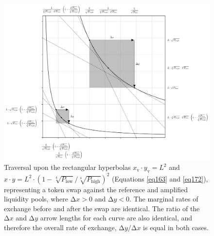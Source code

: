 \documentclass{article}
\begin{document}
\begin{figure}[ht]
    \centering
    \includegraphics[width=\textwidth]{fig34.png}
    \captionsetup{
        justification=raggedright,
        singlelinecheck=false,
        font=small,
        labelfont=bf,
        labelsep=quad,
        format=plain
    }
    \caption{Traversal upon the rectangular hyperbolas $x_{\text{v}} \cdot y_{\text{v}} = L^{2}$ and $x \cdot y = L^{2} \cdot \left(1 - \sqrt[4]{P_{\text{low}}} / \sqrt[4]{P_{\text{high}}} \right)^{2}$ (Equations \ref{eq163} and \ref{eq172}), representing a token swap against the reference and amplified liquidity pools, where $\mathrm{\Delta}x > 0$ and $\mathrm{\Delta}y < 0$. The marginal rates of exchange before and after the swap are identical. The ratio of the $\mathrm{\Delta}x$ and $\mathrm{\Delta}y$ arrow lengths for each curve are also identical, and therefore the overall rate of exchange, $\mathrm{\Delta}y / \mathrm{\Delta}x$ is equal in both cases.}
    \label{fig34}
\end{figure}
\end{document}

